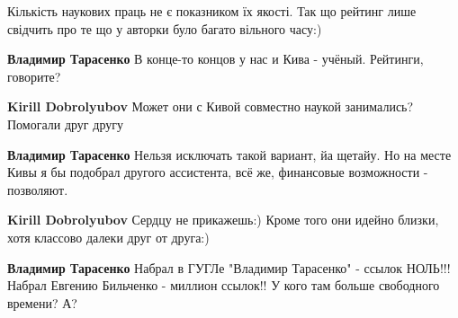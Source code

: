 \begin{itemize}
Кількість наукових праць не є показником їх якості. Так що рейтинг лише свідчить про те що у авторки було багато вільного часу:)

\begin{itemize}
 
\textbf{Владимир Тарасенко} В конце-то концов у нас и Кива - учёный. Рейтинги, говорите? \Smiley[1.0][yellow]

 
\textbf{Kirill Dobrolyubov} Может они с Кивой совместно наукой занимались? \Smiley[1.0][yellow] Помогали друг другу

 
\textbf{Владимир Тарасенко} Нельзя исключать такой вариант, йа щетайу. Но на месте Кивы я бы подобрал другого ассистента, всё же, финансовые возможности - позволяют. \Smiley[1.0][yellow]

 
\textbf{Kirill Dobrolyubov} Сердцу не прикажешь:) Кроме того они идейно близки, хотя классово далеки друг от друга:)

 
\textbf{Владимир Тарасенко} Набрал в ГУГЛе "Владимир Тарасенко" - ссылок НОЛЬ!!! Набрал Евгению Бильченко - миллион ссылок!! У кого там больше свободного времени? А?

 

\end{itemize}
\end{itemize}
